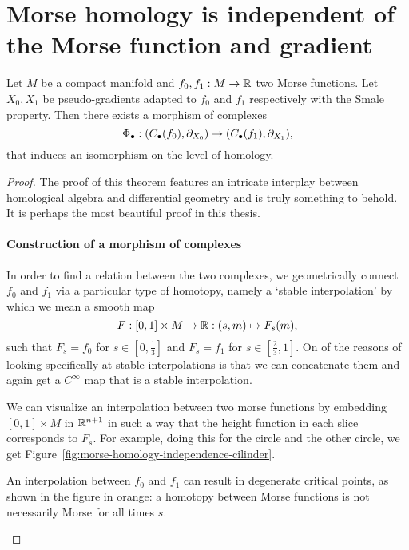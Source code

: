 \section{Morse homology is independent of the Morse function and gradient}
\begin{theorem}
    Let $M$ be a compact manifold and $ f_0, f_1: M \to  \mathbb{R}$ two Morse functions.
    Let $X_0, X_1$ be pseudo-gradients adapted to $f_0$ and $ f_1$ respectively with the Smale property.
    Then there exists a morphism of complexes
    \[
        \Phi_{\bullet}:
        (C_\bullet(f_0), \partial_{X_0}) \to  
        (C_\bullet(f_1), \partial_{X_1})
    ,\] 
    that induces an isomorphism on the level of homology.
\end{theorem}
    
\begin{proof}
The proof of this theorem features an intricate interplay between homological algebra and differential geometry and is truly something to behold. It is perhaps the most beautiful proof in this thesis.
\paragraph{Construction of a morphism of complexes}
In order to find a relation between the two complexes, we geometrically connect $f_0$ and $f_1$ via a particular type of homotopy, namely  a `stable interpolation' by which we mean a smooth map
\[
    F: [0,1] \times M \to \mathbb{R}: (s, m) \mapsto F_s(m)
,\] 
such that $F_s = f_0$ for $s \in \left[0, \frac{1}{3}\right]$ and $F_s = f_1$ for $s \in \left[\frac{2}{3}, 1\right]$.
On of the reasons of looking specifically at stable interpolations is that we can concatenate them and again get a $C^{\infty}$ map that is a stable interpolation.

We can visualize an interpolation between two morse functions by embedding $[0,1] \times M$ in $\mathbb{R}^{n+1}$ in such a way that the height function in each slice corresponds to $F_s$.
For example, doing this for the circle and the other circle, we get Figure~\ref{fig:morse-homology-independence-cilinder}.

\begin{marginfigure}
    \centering
    \caption{An interpolation between $f_0$ and $f_1$ can result in degenerate critical points, as shown in the figure in orange:
        a homotopy between Morse functions is not necessarily Morse for all times $s$.
    }
    \label{fig:morse-homology-independence-cilinder}
\end{marginfigure}


\end{proof}
